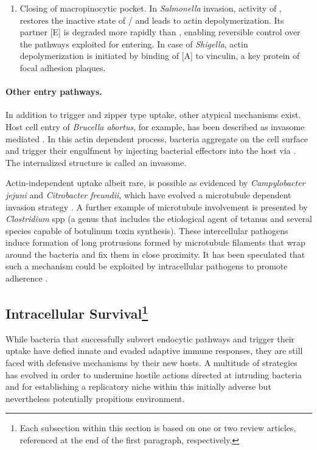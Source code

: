 \begin{enumerate}[label=(\alph*)]
  \item Closing of macropinocytic pocket. In \textit{Salmonella} invasion,  activity of , restores the inactive  state of \slash {} and leads to actin depolymerization. Its  partner [E] is degraded more rapidly than , enabling reversible control over the pathways exploited for entering. In case of \textit{Shigella}, actin depolymerization is initiated by binding of [A] to vinculin, a key protein of focal adhesion plaques.
\end{enumerate}

\paragraph{Other entry pathways.}
In addition to trigger and zipper type uptake, other atypical mechanisms exist. Host cell entry of \textit{Brucella abortus}, for example, has been described as invasome mediated \citep{Dehio2005}. In this actin dependent process, bacteria aggregate on the cell surface and trigger their engulfment by injecting bacterial effectors into the host via . The internalized structure is called an invasome.

Actin-independent uptake albeit rare, is possible as evidenced by \textit{Campylobacter jejuni} and \textit{Citrobacter freundii}, which have evolved a microtubule dependent invasion strategy \citep{Kopecko2001}. A further example of microtubule involvement is presented by \textit{Clostridium} \acrshort{spp} (a genus that includes the etiological agent of tetanus and several species capable of botulinum toxin synthesis). These intercellular pathogens induce formation of long protrusions formed by microtubule filaments that wrap around the bacteria and fix them in close proximity. It has been speculated that such a mechanism could be exploited by intracellular pathogens to promote adherence \citep{Haglund2011}.

\subsection{Intracellular Survival\footnote{Each subsection within this section is based on one or two review articles, referenced at the end of the first paragraph, respectively.}}
While bacteria that successfully subvert endocytic pathways and trigger their uptake have defied innate and evaded adaptive immune responses, they are still faced with defensive mechanisms by their new hosts. A multitude of strategies has evolved in order to undermine hostile actions directed at intruding bacteria and for establishing a replicatory niche within this initially adverse but nevertheless potentially propitious environment.

